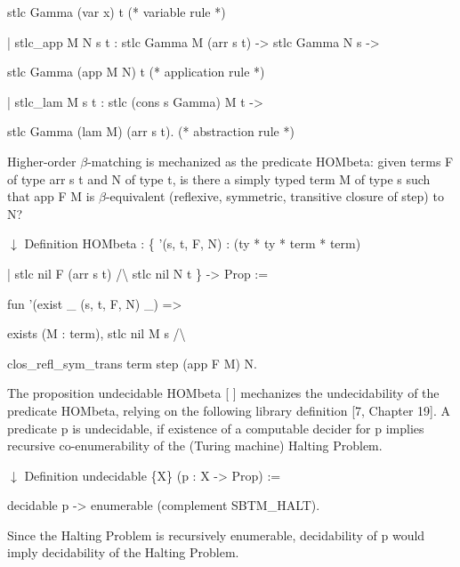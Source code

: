 \documentclass[10pt,a4paper]{amsart}
\begin{document}
  stlc Gamma (var x) t (* variable rule *) 
 
  | stlc\_app M N s t : stlc Gamma M (arr s t) -> stlc Gamma N s -> 
 
  stlc Gamma (app M N) t (* application rule *) 
 
  | stlc\_lam M s t : stlc (cons s Gamma) M t -> 
 
  stlc Gamma (lam M) (arr s t). (* abstraction rule *) 
  
 
 
Higher-order $\beta$-matching is mechanized as the predicate HOMbeta: given terms F of type arr s t and N of type t, is there a simply typed term M of type s such that app F M is $\beta$-equivalent (reflexive, symmetric, transitive closure of step) to N?\par
  \ensuremath{\downarrow} 
 Definition HOMbeta : \{ ’(s, t, F, N) : (ty * ty * term * term) 
 
  | stlc nil F (arr s t) /\textbackslash{} stlc nil N t \} -> Prop := 
 
  fun ’(exist \_ (s, t, F, N) \_) => 
 
  exists (M : term), stlc nil M s /\textbackslash{} 
 
  clos\_refl\_sym\_trans term step (app F M) N. 
  
 
 
The proposition undecidable HOMbeta [ ] mechanizes the undecidability of the predicate HOMbeta, relying on the following library definition [7, Chapter 19]. A predicate p is undecidable, if existence of a computable decider for p implies recursive co-enumerability of the (Turing machine) Halting Problem.\par
  \ensuremath{\downarrow} 
 Definition undecidable \{X\} (p : X -> Prop) := 
 
  decidable p -> enumerable (complement SBTM\_HALT). 
  
Since the Halting Problem is recursively enumerable, decidability of p would imply decidability of the Halting Problem.\par
 
\end{document}
